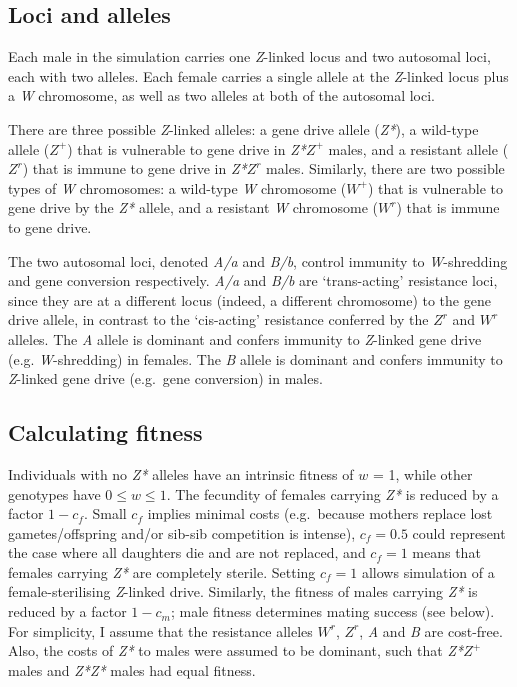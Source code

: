 \documentclass[]{rsos}%
\begin{document}
\hypertarget{loci-and-alleles}{%
\subsection{Loci and alleles}\label{loci-and-alleles}}

Each male in the simulation carries one \emph{Z}-linked locus and two
autosomal loci, each with two alleles. Each female carries a single
allele at the \emph{Z}-linked locus plus a \emph{W} chromosome, as well
as two alleles at both of the autosomal loci.

There are three possible \emph{Z}-linked alleles: a gene drive allele
(\emph{Z*}), a wild-type allele (\(Z^+\)) that is vulnerable to gene
drive in \emph{Z*}\(Z^+\) males, and a resistant allele (\(Z^r\)) that
is immune to gene drive in \emph{Z*}\(Z^r\) males. Similarly, there are
two possible types of \emph{W} chromosomes: a wild-type \emph{W}
chromosome (\(W^+\)) that is vulnerable to gene drive by the \emph{Z*}
allele, and a resistant \emph{W} chromosome (\(W^r\)) that is immune to
gene drive.

The two autosomal loci, denoted \emph{A/a} and \emph{B/b}, control
immunity to \emph{W}-shredding and gene conversion respectively.
\emph{A/a} and \emph{B/b} are `trans-acting' resistance loci, since they
are at a different locus (indeed, a different chromosome) to the gene
drive allele, in contrast to the `cis-acting' resistance conferred by
the \(Z^r\) and \(W^r\) alleles. The \emph{A} allele is dominant and
confers immunity to \emph{Z}-linked gene drive (e.g. \emph{W}-shredding)
in females. The \emph{B} allele is dominant and confers immunity to
\emph{Z}-linked gene drive (e.g.~gene conversion) in males.

\hypertarget{calculating-fitness}{%
\subsection{Calculating fitness}\label{calculating-fitness}}

Individuals with no \emph{Z*} alleles have an intrinsic fitness of \(w\)
= 1, while other genotypes have \(0 \le w \le 1\). The fecundity of
females carrying \emph{Z*} is reduced by a factor \(1 - c_f\). Small
\(c_f\) implies minimal costs (e.g.~because mothers replace lost
gametes/offspring and/or sib-sib competition is intense), \(c_f = 0.5\)
could represent the case where all daughters die and are not replaced,
and \(c_f = 1\) means that females carrying \emph{Z*} are completely
sterile. Setting \(c_f = 1\) allows simulation of a female-sterilising
\emph{Z}-linked drive. Similarly, the fitness of males carrying
\emph{Z*} is reduced by a factor \(1 - c_m\); male fitness determines
mating success (see below). For simplicity, I assume that the resistance
alleles \(W^r\), \(Z^r\), \emph{A} and \emph{B} are cost-free. Also, the
costs of \emph{Z*} to males were assumed to be dominant, such that
\emph{Z*}\(Z^+\) males and \emph{Z*Z*} males had equal fitness.
\end{document}

